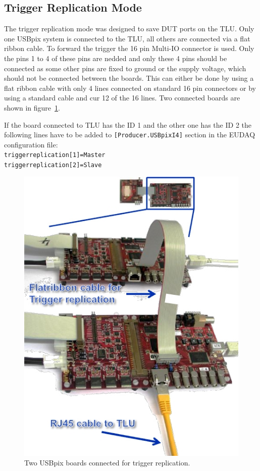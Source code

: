 \documentclass[a4paper,12pt]{article}
\begin{document}
\subsection{Trigger Replication Mode}

The trigger replication mode was designed to save DUT ports on the TLU. Only one
USBpix system is connected to the TLU, all others are connected via a flat ribbon cable.
To forward the trigger the 16 pin Multi-IO connector is used. Only the pins 1 to 4 of
these pins are nedded and only these 4 pins should be connected as some other pins
are fixed to ground or the supply voltage, which should not be connected between the
boards. This can either be done by using a flat ribbon cable with only 4 lines connected
on standard 16 pin connectors or by using a standard cable and cur 12 of the 16 lines.
Two connected boards are shown in figure~\ref{fig:trgrep}.

If the board connected to TLU has the ID 1 and the other one has the ID 2 the following
lines have to be added to {\tt [Producer.USBpixI4]} section in the EUDAQ configuration file:\\
{\tt trigger\textunderscore replication[1]=Master} \\
{\tt trigger\textunderscore replication[2]=Slave}

\begin{figure}[t]
\centerline{\includegraphics[width=.6\textwidth]{trigger_repl.jpg}}
 \caption{Two USBpix boards connected for trigger replication.\label{fig:trgrep}}
\end{figure}
\end{document}
